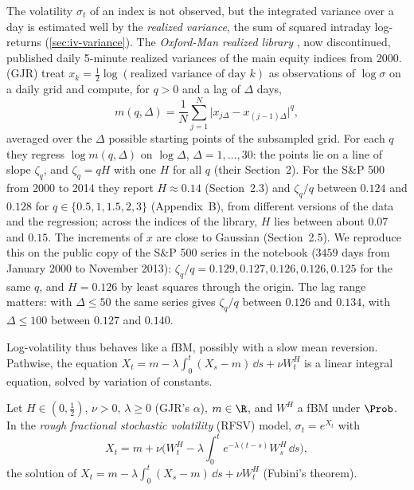 The volatility $\sigma_t$ of an index is not observed, but the integrated variance over a day is
estimated well by the \emph{realized variance}, the sum of squared intraday log-returns
(\cref{sec:iv-variance}). The \emph{Oxford-Man realized library} \citep{heber-oxford-man-2009}, now
discontinued, published daily 5-minute realized variances of the main equity indices from 2000.
\textcite{gatheral-jaisson-rosenbaum-2018} (GJR) treat $x_k=\frac12\log(\text{realized variance of day }k)$ as
observations of $\log\sigma$ on a daily grid and compute, for $q>0$ and a lag of $\Delta$ days,
\begin{equation}\label{eq:rv-m}
  m(q,\Delta)=\frac1N\sum_{j=1}^N\big|x_{j\Delta}-x_{(j-1)\Delta}\big|^q ,
\end{equation}
averaged over the $\Delta$ possible starting points of the subsampled grid. For each $q$ they regress $\log m(q,\Delta)$
on $\log\Delta$, $\Delta=1,\dots,30$: the points lie on a line of slope $\zeta_q$, and $\zeta_q=qH$ with one
$H$ for all $q$ (their Section~2). For the S\&P 500 from 2000 to 2014 they report $H\approx0.14$
(Section~2.3) and $\zeta_q/q$ between $0.124$ and $0.128$ for $q\in\{0.5,1,1.5,2,3\}$ (Appendix~B), from
different versions of the data and the regression;
across the indices of the library, $H$ lies between about $0.07$ and $0.15$. The increments of $x$ are close
to Gaussian (Section~2.5). We reproduce this on the public copy of the S\&P 500 series in the notebook
($3459$ days from January 2000 to November 2013): $\zeta_q/q=0.129,0.127,0.126,0.126,0.125$ for the same $q$, and
$H=0.126$ by least squares through the origin. The lag range matters: with $\Delta\le50$ the same series gives
$\zeta_q/q$ between $0.126$ and $0.134$, with $\Delta\le100$ between $0.127$ and $0.140$.

Log-volatility thus behaves like a fBM, possibly with a slow mean reversion. Pathwise, the
equation $X_t=m-\lambda\int_0^t(X_s-m)\,\dd s+\nu W^H_t$ is a linear integral equation, solved by variation of
constants.

\begin{definition}\label{def:rv-rfsv}
Let $H\in(0,\frac12)$, $\nu>0$, $\lambda\ge0$ (GJR's $\alpha$), $m\in\R$, and $W^H$ a fBM under $\Prob$. In the \emph{rough
fractional stochastic volatility} (RFSV) model, $\sigma_t=e^{X_t}$ with
\begin{equation}\label{eq:rv-rfsv}
  X_t=m+\nu\Big(W^H_t-\lambda\int_0^te^{-\lambda(t-s)}W^H_s\,\dd s\Big),
\end{equation}
the solution of $X_t=m-\lambda\int_0^t(X_s-m)\,\dd s+\nu W^H_t$ (Fubini's theorem).
\end{definition}

